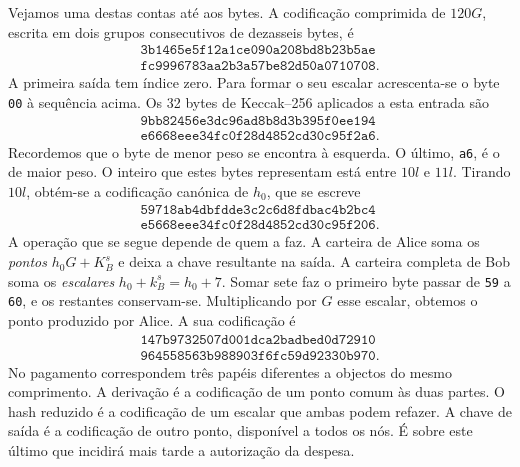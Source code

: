 Vejamos uma destas contas até aos bytes. A codificação comprimida
de \(120G\), escrita em dois grupos consecutivos de dezasseis bytes,
é
\[
\begin{gathered}
 \texttt{3b1465e5f12a1ce090a208bd8b23b5ae}\\
 \texttt{fc9996783aa2b3a57be82d50a0710708}.
\end{gathered}
\]
A primeira saída tem índice zero. Para formar o seu escalar
acrescenta-se o byte \texttt{00} à sequência acima. Os 32 bytes
de Keccak--256 aplicados a esta entrada são
\[
\begin{gathered}
 \texttt{9bb82456e3dc96ad8b8d3b395f0ee194}\\
 \texttt{e6668eee34fc0f28d4852cd30c95f2a6}.
\end{gathered}
\]
Recordemos que o byte de menor peso se encontra à esquerda.
O último, \texttt{a6}, é o de maior peso. O inteiro que estes bytes
representam está entre \(10l\) e \(11l\). Tirando \(10l\), obtém-se
a codificação canónica de \(h_0\), que se escreve
\[
\begin{gathered}
 \texttt{59718ab4dbfdde3c2c6d8fdbac4b2bc4}\\
 \texttt{e5668eee34fc0f28d4852cd30c95f206}.
\end{gathered}
\]
A operação que se segue depende de quem a faz. A carteira de Alice
soma os \emph{pontos} \(h_0G+K_B^s\) e deixa a chave resultante na
saída. A carteira completa de Bob soma os \emph{escalares}
\(h_0+k_B^s=h_0+7\). Somar sete faz o primeiro byte passar de
\texttt{59} a \texttt{60}, e os restantes conservam-se.
Multiplicando por \(G\) esse escalar, obtemos o ponto produzido por
Alice. A sua codificação é
\[
\begin{gathered}
 \texttt{147b9732507d001dca2badbed0d72910}\\
 \texttt{964558563b988903f6fc59d92330b970}.
\end{gathered}
\]
No pagamento correspondem três papéis diferentes a objectos do
mesmo comprimento. A derivação é a codificação de um ponto comum
às duas partes. O hash reduzido é a codificação de um escalar que
ambas podem refazer. A chave de saída é a codificação de outro
ponto, disponível a todos os nós. É sobre este último que incidirá
mais tarde a autorização da despesa.

